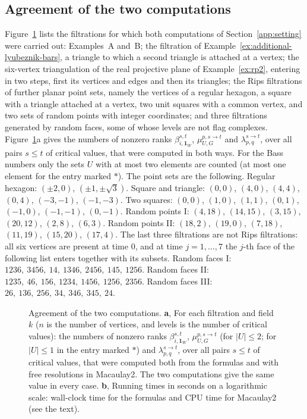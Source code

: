 \documentclass[11pt]{article}
\theoremstyle{plain}
\theoremstyle{definition}
\begin{document}
\subsection{Agreement of the two computations}\label{app:agreement}

Figure~\ref{fig:app-agreement} lists the filtrations for which both computations of Section~\ref{app:setting} were carried out: Examples~A and~B; the filtration of Example~\ref{ex:additional-lyubeznik-bars}, a triangle to which a second triangle is attached at a vertex; the six-vertex triangulation of the real projective plane of Example~\ref{ex:rp2}, entering in two steps, first its vertices and edges and then its triangles; the Rips filtrations of further planar point sets, namely the vertices of a regular hexagon, a square with a triangle attached at a vertex, two unit squares with a common vertex, and two sets of random points with integer coordinates; and three filtrations generated by random faces, some of whose levels are not flag complexes. Figure~\ref{fig:app-agreement}a gives the numbers of nonzero ranks $\beta^{s,t}_{i,\mathbf 1_W}$, $\mu^{p,s\to t}_{U,G}$ and $\lambda^{s\to t}_{p,q}$, over all pairs $s\le t$ of critical values, that were computed in both ways. For the Bass numbers only the sets $U$ with at most two elements are counted (at most one element for the entry marked $\ast$).
The point sets are the following. Regular hexagon: $(\pm2,0)$, $(\pm1,\pm\sqrt3)$. Square and triangle: $(0,0)$, $(4,0)$, $(4,4)$, $(0,4)$, $(-3,-1)$, $(-1,-3)$. Two squares: $(0,0)$, $(1,0)$, $(1,1)$, $(0,1)$, $(-1,0)$, $(-1,-1)$, $(0,-1)$. Random points I: $(4,18)$, $(14,15)$, $(3,15)$, $(20,12)$, $(2,8)$, $(6,3)$. Random points II: $(18,2)$, $(19,0)$, $(7,18)$, $(11,19)$, $(15,20)$, $(17,4)$. The last three filtrations are not Rips filtrations: all six vertices are present at time $0$, and at time $j=1,\dots,7$ the $j$-th face of the following list enters together with its subsets. Random faces I: $1236,\ 3456,\ 14,\ 1346,\ 2456,\ 145,\ 1256$. Random faces II: $1235,\ 46,\ 156,\ 1234,\ 1456,\ 1256,\ 2356$. Random faces III: $26,\ 136,\ 256,\ 34,\ 346,\ 345,\ 24$.

\begin{figure}[htbp]
\centering
{}
\caption{Agreement of the two computations. \textbf{a}, For each filtration and field $k$ ($n$ is the number of vertices, and levels is the number of critical values): the numbers of nonzero ranks $\beta^{s,t}_{i,\mathbf 1_W}$, $\mu^{p,s\to t}_{U,G}$ (for $|U|\le2$; for $|U|\le1$ in the entry marked $\ast$) and $\lambda^{s\to t}_{p,q}$, over all pairs $s\le t$ of critical values, that were computed both from the formulas and with free resolutions in Macaulay2. The two computations give the same value in every case. \textbf{b}, Running times in seconds on a logarithmic scale: wall-clock time for the formulas and CPU time for Macaulay2 (see the text).}\label{fig:app-agreement}
\end{figure}
\end{document}
